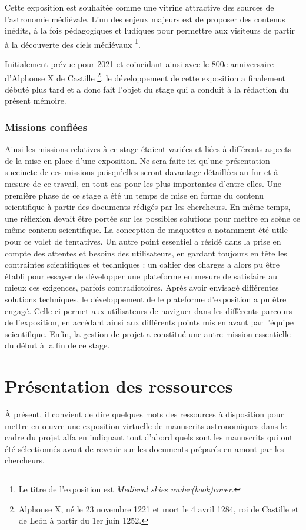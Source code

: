 	Cette exposition est souhaitée comme une vitrine attractive des sources de l’astronomie médiévale. L’un des enjeux majeurs est de proposer des contenus inédits, à la fois pédagogiques et ludiques pour permettre aux visiteurs de partir à la découverte des ciels médiévaux \footnote{Le titre de l’exposition est \textit{Medieval skies under(book)cover}.}. 
	
	Initialement prévue pour 2021 et coïncidant ainsi avec le 800e anniversaire d’Alphonse X de Castille \footnote{Alphonse X, né le 23 novembre 1221 et mort le 4 avril 1284, roi de Castille et de León à partir du 1er juin 1252.}, le développement de cette exposition a finalement débuté plus tard et a donc fait l’objet du stage qui a conduit à la rédaction du présent mémoire.  
	
	\subsection{Missions confiées}
    Ainsi les missions relatives à ce stage étaient variées et liées à différents aspects de la mise en place d’une exposition. Ne sera faite ici qu’une présentation succincte de ces missions puisqu’elles seront davantage détaillées au fur et à mesure de ce travail, en tout cas pour les plus importantes d’entre elles. Une première phase de ce stage a été un temps de mise en forme du contenu scientifique à partir des documents rédigés par les chercheurs. En même temps, une réflexion devait être portée sur les possibles solutions pour mettre en scène ce même contenu scientifique. La conception de maquettes a notamment été utile pour ce volet de tentatives. Un autre point essentiel a résidé dans la prise en compte des attentes et besoins des utilisateurs, en gardant toujours en tête les contraintes scientifiques et techniques : un cahier des charges a alors pu être établi pour essayer de développer une plateforme en mesure de satisfaire au mieux ces exigences, parfois contradictoires. Après avoir envisagé différentes solutions techniques, le développement de le plateforme d’exposition a pu être engagé. Celle-ci permet aux utilisateurs de naviguer dans les différents parcours de l’exposition, en accédant ainsi aux différents points mis en avant par l’équipe scientifique. Enfin, la gestion de projet a constitué une autre mission essentielle du début à la fin de ce stage. 

	\chapter{Présentation des ressources}
	À présent, il convient de dire quelques mots des ressources à disposition pour mettre en œuvre une exposition virtuelle de manuscrits astronomiques dans le cadre du projet \acrshort{alfa} en indiquant tout d’abord quels sont les manuscrits qui ont été sélectionnés avant de revenir sur les documents préparés en amont par les chercheurs. 

